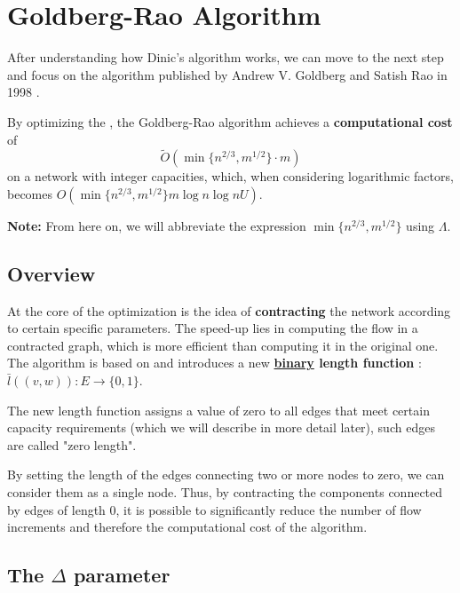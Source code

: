 
\chapter{Goldberg-Rao Algorithm}

\label{chap:gbr}
After understanding how Dinic's algorithm works, we can move to the next step and focus on the algorithm published by Andrew V. Goldberg and Satish Rao in 1998 \cite{Goldberg_Rao}.

\noindent By optimizing the , the Goldberg-Rao algorithm achieves a \textbf{computational cost} of 
\[
\tilde{O}(\min\{n^{2/3}, m^{1/2}\} \cdot m)
\]
on a network with integer capacities, which, when considering logarithmic factors, becomes \( O(\min\{n^{2/3}, m^{1/2}\} m \log n \log nU) \).

\textbf{Note:} From here on, we will abbreviate the expression \( \min\{n^{2/3}, m^{1/2}\} \) using \( \Lambda \).

\section{Overview}

    At the core of the optimization is the idea of \textbf{contracting} the network according to certain specific parameters.  
    The speed-up lies in computing the flow in a contracted graph, which is more efficient than computing it in the original one.
    The algorithm is based on  and introduces a new  \textbf{\underline{binary} length function} : \( \bar{l}((v,w)): E \rightarrow \{0,1\} \).  

    The new length function assigns a value of zero to all edges that meet certain capacity requirements (which we will describe in more detail later), such edges are called "zero length".

    By setting the length of the edges connecting two or more nodes to zero, we can consider them as a single node.  
    Thus, by contracting the components connected by edges of length 0, it is possible to significantly reduce the number of flow increments and therefore the computational cost of the algorithm.

\section{The $\Delta$ parameter}

